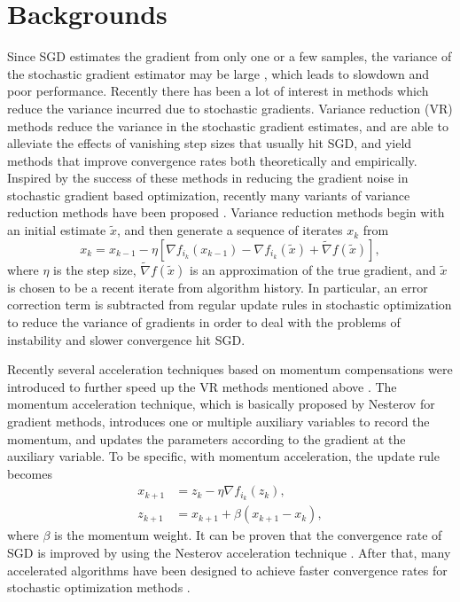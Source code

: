 \documentclass[letterpaper]{article} %
\begin{document}
\section{Backgrounds}
Since SGD estimates the gradient from only one or a few samples, the variance of the stochastic gradient estimator may be large \cite{Johnson12,Zhao2015}, which leads to slowdown and poor performance. Recently there has been a lot of interest in methods which reduce the variance incurred due to stochastic
gradients. Variance reduction (VR) methods \cite{Johnson12,Defazio2014} reduce the variance in the stochastic gradient estimates, and are able to alleviate the effects of vanishing step sizes that usually hit SGD, and yield methods that improve convergence rates both theoretically and empirically. 
Inspired by the success of these methods in reducing the gradient noise in stochastic gradient based optimization, recently many variants of variance reduction methods have been proposed \cite{Konecny2016,Li2016,Xiao2014,Allen-Zhu2016,shang2018guaranteed}. Variance reduction methods begin with an initial estimate $\widetilde{x}$, and then generate a sequence of iterates $x_k$ from
\[x_k = x_{k-1} - \eta\left[\nabla f_{i_k}(x_{k-1})-\nabla f_{i_k}(\widetilde{x}) + \widetilde{\nabla}f(\widetilde{x})\right],
\]
where $\eta$ is the step size, $\widetilde{\nabla}f(\widetilde{x})$ is an approximation of the true gradient, and $\widetilde{x}$ is chosen to be a recent iterate from algorithm history. In particular, an error correction term is subtracted from regular update rules in stochastic optimization to reduce the variance of gradients in order to deal with the problems of instability and slower convergence hit SGD.


Recently several acceleration techniques based on momentum compensations were introduced to further speed up the VR methods mentioned above \cite{Hu2009,Lin2015,nitanda2014,Allen-Zhu17}. The momentum acceleration technique, which is basically proposed by Nesterov \cite{Nesterov2004} for gradient methods, introduces one or multiple auxiliary variables to record the momentum, and updates the parameters according to the gradient at the auxiliary variable. To be specific, with momentum acceleration, the update rule becomes
\begin{equation}
\begin{split}
x_{k+1}& = z_k-\eta \nabla f_{i_k}(z_k),\\
z_{k+1}& = x_{k+1} + \beta (x_{k+1}-x_{k}),
\end{split}
\end{equation}
where $\beta$ is the momentum weight. It can be proven that the convergence rate of SGD
is improved by using the Nesterov acceleration technique \cite{Hu2009}.
After that, many accelerated algorithms have been designed to achieve faster convergence rates for stochastic optimization methods \cite{Shalev-Shwartz2014,Allen-Zhu17,Fercoq2015,Lin2015}.
\end{document}
